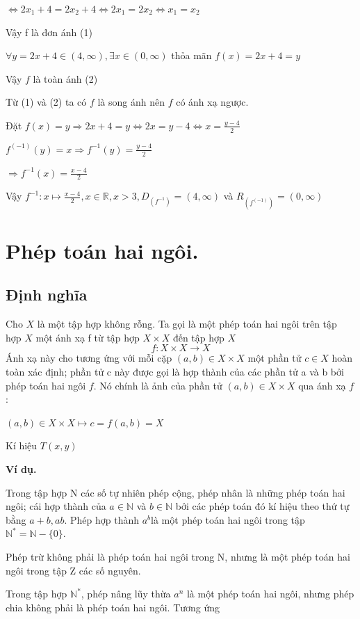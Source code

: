\documentclass[12pt,oneside,a4paper,reqno]{book}
\begin{document}
$\Leftrightarrow 2x_1+4=2x_2+4\Leftrightarrow 2x_1=2x_2\Leftrightarrow x_1=x_2$

Vậy f là đơn ánh   (1)

$\forall y=2x+4\in (4,\infty),\exists x\in (0,\infty)$  thỏa mãn $f(x)=2x+4=y$

Vậy $f$ là toàn ánh  (2)

Từ (1) và (2) ta có $f$ là song ánh nên $f$ có ánh xạ ngược.

Đặt $f(x)=y \Rightarrow 2x+4=y\Leftrightarrow 2x=y-4\Leftrightarrow x=\frac{y-4}{2}$

$f^(-1) (y)=x \Rightarrow f^{-1} (y)=\frac{y-4}{2}$

$\Rightarrow f^{-1} (x)=\frac{x-4}{2}$

Vậy $f^{-1}:x\mapsto \frac{x-4}{2},x\in \mathbb{R},x>3 , D_(f^{-1} )=(4,\infty)$ và $R_(f^(-1) )=(0,\infty)$

\section{Phép toán hai ngôi.}

\subsection{Định nghĩa}
Cho $X$ là một tập hợp không rỗng. Ta gọi là một phép toán hai ngôi trên tập hợp $X$ một ánh xạ f từ tập hợp $X\times X$ đến tập hợp $X$
                                      $$ f:X\times X\to X$$
 Ánh xạ này cho tương ứng với mỗi cặp $(a,b)\in X\times X$ một phần tử $c\in X$ hoàn toàn xác định; phần tử c này được gọi là hợp thành của các phần tử a và b bởi phép toán hai ngôi $f$. Nó chính là ảnh của phần tử $(a,b)\in X\times  X$ qua ánh xạ $f$:

$(a,b)\in X\times X\mapsto c=f(a,b)=X$

Kí hiệu $T(x,y)$

\textbf{Ví dụ.}

Trong tập hợp N các số tự nhiên phép cộng, phép nhân là những phép toán hai ngôi; cái hợp thành của $a\in \mathbb{N}$ và $b\in \mathbb{N}$ bởi các phép toán đó kí hiệu theo thứ tự bằng $a+b,ab$. Phép hợp thành $a^b $là một phép toán hai ngôi trong tập $\mathbb{N}^*=\mathbb{N}-\{0\}.$

Phép trừ không  phải là phép toán hai ngôi trong N, nhưng là một phép toán hai ngôi trong tập Z các số nguyên.

Trong tập hợp $ \mathbb{N}^*$, phép nâng lũy thừa $a^n$ là một phép toán hai ngôi, nhưng phép chia không phải là phép toán hai ngôi.
Tương ứng
\end{document}
